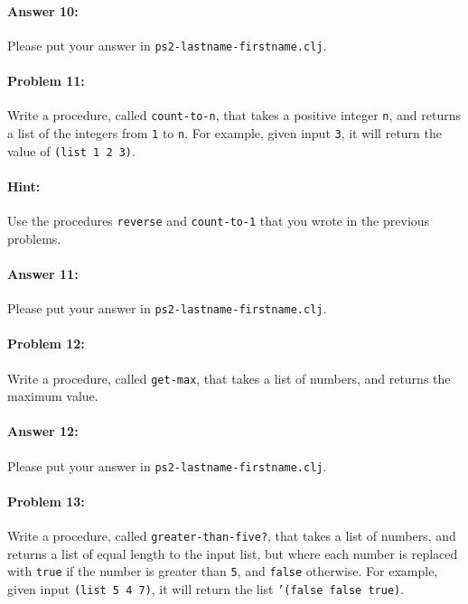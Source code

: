 \documentclass[10pt]{article}
\newcommand{\PSnum}{2}
\begin{document}
\paragraph{Answer 10:} Please put your answer in \texttt{ps\PSnum-lastname-firstname.clj}.

\noindent\hrulefill %

\paragraph{Problem 11:}
  Write a procedure, called \texttt{count-to-n}, that takes a positive
  integer \texttt{n}, and returns a list of the integers from
  \texttt{1} to \texttt{n}. For example, given input \texttt{3}, it
  will return the value of \texttt{(list 1 2 3)}. 
  
\paragraph{Hint:} 
  Use the procedures \texttt{reverse} 
  and \texttt{count-to-1} that you wrote in the previous problems.

\paragraph{Answer 11:} Please put your answer in \texttt{ps\PSnum-lastname-firstname.clj}.

\noindent\hrulefill %

\paragraph{Problem 12:}
  Write a procedure, called \texttt{get-max}, that takes a list of numbers,
  and returns the maximum value.

\paragraph{Answer 12:} Please put your answer in \texttt{ps\PSnum-lastname-firstname.clj}.

\noindent\hrulefill %

\paragraph{Problem 13:}
  Write a procedure, called \texttt{greater-than-five?}, that takes a
  list of numbers, and returns a list of equal length to the input list,
  but where each number is replaced with \texttt{true} if the
  number is greater than \texttt{5}, and \texttt{false} otherwise. For
  example, given input \texttt{(list 5 4 7)}, it will return the list
  \texttt{'(false false true)}. 
\end{document}
